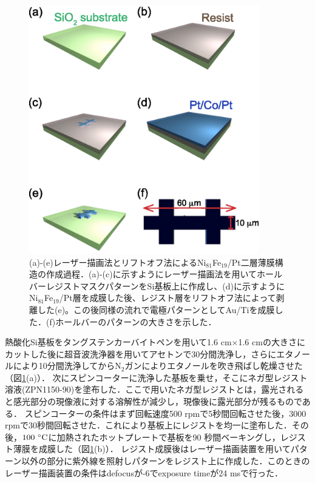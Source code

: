 \begin{figure}[htbp]
 \begin{center}
  \includegraphics[width=100mm]{images/Making_samples.eps}
 \end{center}
 \caption{(a)-(e)レーザー描画法とリフトオフ法によるNi$_{81}$Fe$_{19}$/Pt二層薄膜構造の作成過程．(a)-(c)に示すようにレーザー描画法を用いてホールバーレジストマスクパターンをSi基板上に作成し、(d)に示すようにNi$_{81}$Fe$_{19}$/Pt層を成膜した後、レジスト層をリフトオフ法によって剥離した(e)。この後同様の流れで電極パターンとしてAu/Tiを成膜した．(f)ホールバーのパターンの大きさを示した．}
 \label{Making_samples}
\end{figure}

熱酸化Si基板をタングステンカーバイトペンを用いて1.6 cm$\times$1.6 cmの大きさにカットした後に超音波洗浄器を用いてアセトンで30分間洗浄し，さらにエタノールにより10分間洗浄してからN$_2$ガンによりエタノールを吹き飛ばし乾燥させた（図\ref{Making_samples}(a)）．
次にスピンコーターに洗浄した基板を乗せ，そこにネガ型レジスト溶液(ZPN1150-90)を塗布した．ここで用いたネガ型レジストとは，露光されると感光部分の現像液に対する溶解性が減少し，現像後に露光部分が残るものである．
スピンコーターの条件はまず回転速度500 rpmで5秒間回転させた後，3000 rpmで30秒間回転させた．これにより基板上にレジストを均一に塗布した．その後，$100\rm\ ^{\circ}C$に加熱されたホットプレートで基板を90 秒間ベーキングし，レジスト薄膜を成膜した（図\ref{Making_samples}(b)）．
レジスト成膜後はレーザー描画装置を用いてパターン以外の部分に紫外線を照射しパターンをレジスト上に作成した．このときのレーザー描画装置の条件はdefocusが-6でexposure timeが24 msで行った．



